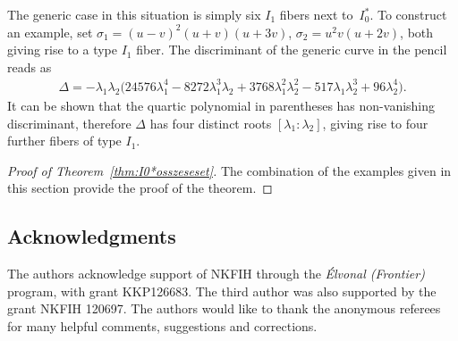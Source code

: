 \documentclass[10pt,a4paper]{amsart}
\numberwithin{equation}{section}
\begin{document}
\begin{Example} The generic case in this situation is simply six $I_1$ fibers next to~$I_0^*$.
To construct an example, set $\sigma_1 = (u-v)^2 (u+v) (u+3v)$, $\sigma_2 = u^2 v (u+2v)$, both giving rise to a type $I_1$ fiber.
The discriminant of the generic curve in the pencil reads as
\begin{gather*}
 \Delta = - \lambda_1 \lambda_2 \big(24576 \lambda_1^4 - 8272 \lambda_1^3 \lambda_2 + 3768 \lambda_1^2 \lambda_2^2 -517 \lambda_1 \lambda_2^3 + 96 \lambda_2^4\big).
\end{gather*} It can be shown that the quartic polynomial in parentheses has non-vanishing discriminant, therefore $\Delta$ has four distinct roots $[\lambda_1 : \lambda_2]$, giving rise to four further fibers of type $I_1$.
\end{Example}

\begin{proof}[Proof of Theorem~\ref{thm:I0*osszeseset}]
The combination of the examples given in this section provide the proof of the theorem.
\end{proof}

\subsection*{Acknowledgments}
The authors acknowledge support of NKFIH through the \emph{\'Elvonal (Frontier)} program, with grant KKP126683. The third author was also supported by the grant NKFIH 120697.
The authors would like to thank the anonymous referees for many helpful comments, suggestions and corrections.

\end{document}
